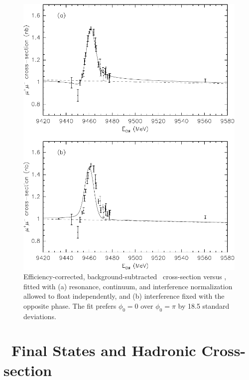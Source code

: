 \documentclass{cornell}
\begin{document}
\begin{figure}
  \begin{center}
    \includegraphics[width=0.9\linewidth]{newnewplots/newmumu}
  \end{center}
  \caption[Interference in the \mumu\ channel]{\label{newmumu}
  Efficiency-corrected, background-subtracted \mumu\ cross-section
  versus \ecm, fitted with (a) resonance, continuum, and interference
  normalization allowed to float independently, and (b) interference
  fixed with the opposite phase.  The fit prefers $\phi_0=0$ over
  $\phi_0=\pi$ by 18.5 standard deviations.}
\end{figure}

\section{\boldmath \ups\ Final States and Hadronic Cross-section}
\end{document}

